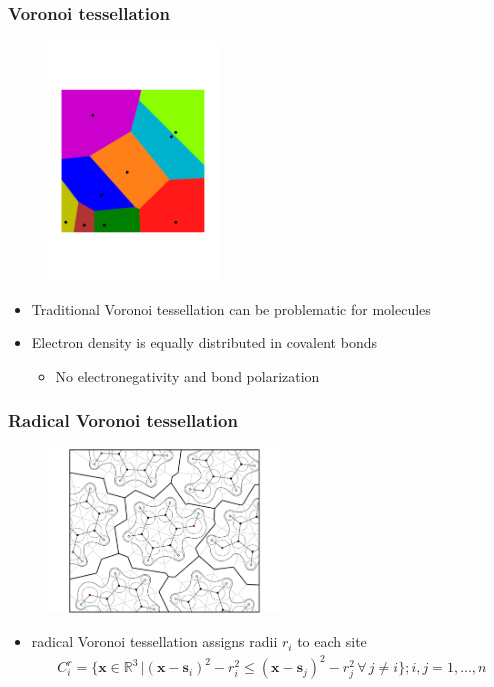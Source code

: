\documentclass[t]{beamer}
\begin{document}
	\begin{frame}
	    \frametitle{Voronoi tessellation}
	    \begin{figure}
            \includegraphics[width=0.4\textwidth]{figures/Voronoi.pdf}
        \end{figure}
        \begin{itemize}
            \item Traditional Voronoi tessellation can be problematic for molecules 
            \item Electron density is equally distributed in covalent bonds
            \begin{itemize}\normalsize
                \item No electronegativity and bond polarization
            \end{itemize}
        \end{itemize}
	\end{frame}
	\begin{frame}
	    \frametitle{Radical Voronoi tessellation}
	    \begin{figure}
            \includegraphics[width=0.55\textwidth]{figures/MT_voronoi.pdf}
        \end{figure}
        \begin{itemize}
            \item radical Voronoi tessellation assigns radii $r_i$ to each site
            \begin{align*}
                C_i^r = \{ \mathbf{x} \in \mathbb{R}^3 \, | ( \mathbf{x} - \mathbf{s}_i )^2 - r_i^2 \leq ( \mathbf{x} - \mathbf{s}_j )^2 - r_j^2 \, \forall \, j \neq i \}; i,j=1,...,n
			\end{align*}
        \end{itemize}
	\end{frame}
\end{document}
